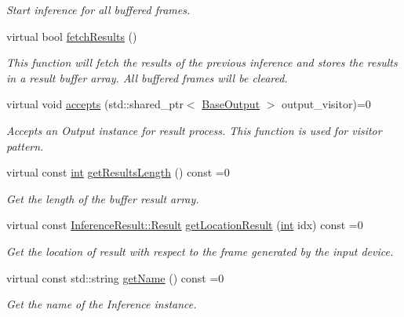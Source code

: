 \begin{DoxyCompactItemize}
\begin{DoxyCompactList}\small\item\em Start inference for all buffered frames. \end{DoxyCompactList}\item 
virtual bool \hyperlink{classopenvino__service_1_1BaseInference_a9604e193581d6f458634035059342a2c}{fetch\+Results} ()
\begin{DoxyCompactList}\small\item\em This function will fetch the results of the previous inference and stores the results in a result buffer array. All buffered frames will be cleared. \end{DoxyCompactList}\item 
virtual void \hyperlink{classopenvino__service_1_1BaseInference_a910a5b98530670736f525317870c7682}{accepts} (std\+::shared\+\_\+ptr$<$ \hyperlink{classBaseOutput}{Base\+Output} $>$ output\+\_\+visitor)=0
\begin{DoxyCompactList}\small\item\em Accepts an Output instance for result process. This function is used for visitor pattern. \end{DoxyCompactList}\item 
virtual const \hyperlink{CMakeCache_8txt_a79a3d8790b2588b09777910863574e09}{int} \hyperlink{classopenvino__service_1_1BaseInference_a6380b6f2baf1e14d5e89922be077d607}{get\+Results\+Length} () const =0
\begin{DoxyCompactList}\small\item\em Get the length of the buffer result array. \end{DoxyCompactList}\item 
virtual const \hyperlink{structInferenceResult_1_1Result}{Inference\+Result\+::\+Result} \hyperlink{classopenvino__service_1_1BaseInference_a0e600e89af8796fab69a31732f86c32d}{get\+Location\+Result} (\hyperlink{CMakeCache_8txt_a79a3d8790b2588b09777910863574e09}{int} idx) const =0
\begin{DoxyCompactList}\small\item\em Get the location of result with respect to the frame generated by the input device. \end{DoxyCompactList}\item 
virtual const std\+::string \hyperlink{classopenvino__service_1_1BaseInference_add0726f9fc1f0c44288fea3306255bd2}{get\+Name} () const =0
\begin{DoxyCompactList}\small\item\em Get the name of the Inference instance. \end{DoxyCompactList}\end{DoxyCompactItemize}

